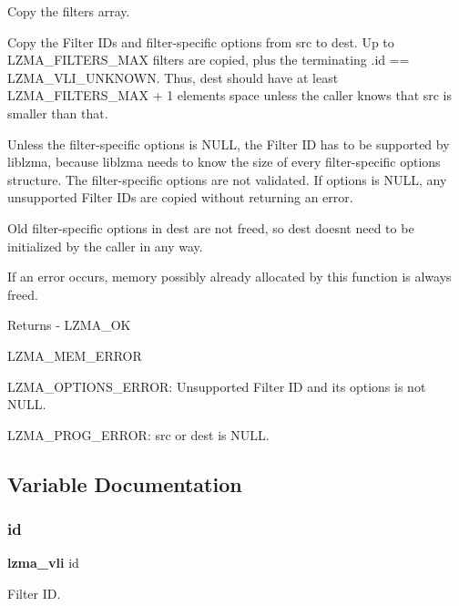 Copy the filters array. 

Copy the Filter I\+Ds and filter-\/specific options from src to dest. Up to L\+Z\+M\+A\+\_\+\+F\+I\+L\+T\+E\+R\+S\+\_\+\+M\+AX filters are copied, plus the terminating .id == L\+Z\+M\+A\+\_\+\+V\+L\+I\+\_\+\+U\+N\+K\+N\+O\+WN. Thus, dest should have at least L\+Z\+M\+A\+\_\+\+F\+I\+L\+T\+E\+R\+S\+\_\+\+M\+AX + 1 elements space unless the caller knows that src is smaller than that.

Unless the filter-\/specific options is N\+U\+LL, the Filter ID has to be supported by liblzma, because liblzma needs to know the size of every filter-\/specific options structure. The filter-\/specific options are not validated. If options is N\+U\+LL, any unsupported Filter I\+Ds are copied without returning an error.

Old filter-\/specific options in dest are not freed, so dest doesn\textquotesingle{}t need to be initialized by the caller in any way.

If an error occurs, memory possibly already allocated by this function is always freed.

\begin{DoxyReturn}{Returns}
-\/ L\+Z\+M\+A\+\_\+\+OK
\begin{DoxyItemize}
\item L\+Z\+M\+A\+\_\+\+M\+E\+M\+\_\+\+E\+R\+R\+OR
\item L\+Z\+M\+A\+\_\+\+O\+P\+T\+I\+O\+N\+S\+\_\+\+E\+R\+R\+OR\+: Unsupported Filter ID and its options is not N\+U\+LL.
\item L\+Z\+M\+A\+\_\+\+P\+R\+O\+G\+\_\+\+E\+R\+R\+OR\+: src or dest is N\+U\+LL. 
\end{DoxyItemize}
\end{DoxyReturn}


\subsection{Variable Documentation}
\mbox{\label{filter__common_8c_a3ee597b96b2ff619e515fac79a1ba1c5}} 
\subsubsection{id}
{\footnotesize\ttfamily \textbf{ lzma\+\_\+vli} id}



Filter ID. 

